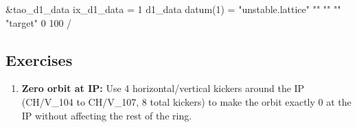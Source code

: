 \documentclass{hitec}     %
\begin{document}
{{{{\begin{enumerate}[leftmargin=*]
\begin{code}
&tao_d1_data
	ix_d1_data = 1
	d1_data%
	datum(1) = "unstable.lattice" "" "" "" "target" 0 100
/
\end{code}

\end{enumerate}

\subsection{Exercises}

\begin{enumerate}[leftmargin=*]
%
\item {\bf Zero orbit at IP:}
Use 4 horizontal/vertical kickers around the IP (CH/V_104 to CH/V_107, 8 total kickers) to make the orbit exactly 0 at the IP without affecting the rest of the ring.
%
\end{enumerate}

\newpage








}}}}
\end{document}
